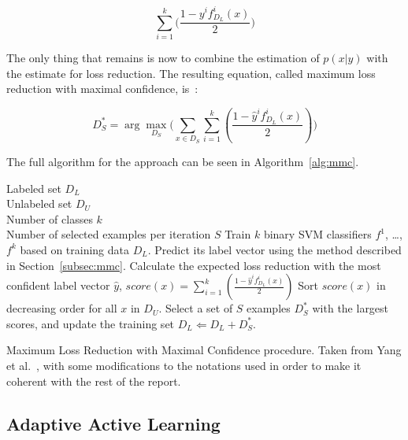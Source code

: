 \begin{equation}
    \sum_{i=1}^k\big ( \frac{1 - y^if^i_{D_L}(x)}{2} \big )
\end{equation}

The only thing that remains is now to combine the estimation of $p(x|y)$ with the estimate for loss reduction.
The resulting equation, called maximum loss reduction with maximal confidence, is~\cite{yang2009effective}:

\begin{equation}
    D^*_S = \arg \max_{D_S} \big ( \sum_{x \in D_S} \sum_{i=1}^k (\frac{1 - \hat{y}^if^i_{D_L}(x)}{2}) \big )
\end{equation}

The full algorithm for the approach can be seen in Algorithm~\ref{alg:mmc}.

\begin{algorithm}
    \begin{algorithmic}
        \REQUIRE Labeled set $D_L$\\
                 Unlabeled set $D_U$ \\
                 Number of classes $k$ \\
                 Number of selected examples per iteration $S$
        \REPEAT
            \STATE Train $k$ binary SVM classifiers $f^1$, \dots, $f^k$ based on training data $D_L$.
                \STATE Predict its label vector using the method described in Section~\ref{subsec:mmc}.
                \STATE Calculate the expected loss reduction with the most confident label vector $\hat{y}$, $score(x) = \sum_{i=1}^k (\frac{1 - \hat{y}^if^i_{D_L}(x)}{2})$
            \ENDFOR
            \STATE Sort $score(x)$ in decreasing order for all $x$ in $D_U$.
            \STATE Select a set of $S$ examples $D_S^*$ with the largest scores, and update the training set $D_L \Leftarrow D_L + D^*_S$.
    \end{algorithmic}

    \caption{Maximum Loss Reduction with Maximal Confidence procedure. Taken from Yang et al\@.~\cite{yang2009effective}, with some modifications to the notations used in order to make it coherent with the rest of the report.}
    \label{alg:mmc}
\end{algorithm}


\subsection{Adaptive Active Learning}\label{subsec:adaptive-active-learning}


